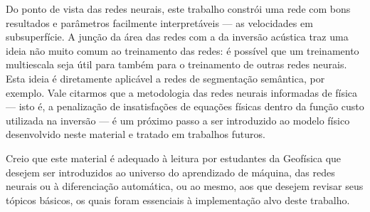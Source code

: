   Do ponto de vista das redes neurais, este trabalho constrói uma rede com bons resultados e parâmetros facilmente interpretáveis --- as velocidades em subsuperfície. A junção da área das redes com a da inversão acústica traz uma ideia não muito comum ao treinamento das redes: é possível que um treinamento multiescala seja útil para também para o treinamento de outras redes neurais. Esta ideia é diretamente aplicável a redes de segmentação semântica, por exemplo. Vale citarmos que a metodologia das redes neurais informadas de física --- isto é, a penalização de insatisfações de equações físicas dentro da função custo utilizada na inversão --- é um próximo passo a ser introduzido ao modelo físico desenvolvido neste material e tratado em trabalhos futuros.

  Creio que este material é adequado à leitura por estudantes da Geofísica que desejem ser introduzidos ao universo do aprendizado de máquina, das redes neurais ou à diferenciação automática, ou ao mesmo, aos que desejem revisar seus tópicos básicos, os quais foram essenciais à implementação alvo deste trabalho.
